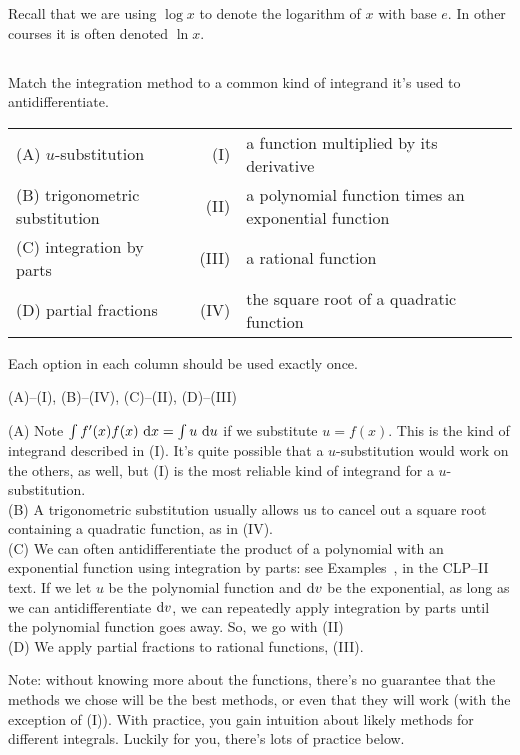 %
%

\noindent
Recall that we are using $\log x$ to denote the logarithm of $x$ with
base $e$. In other courses it is often denoted $\ln x$.


\subsection*{\Conceptual}
\begin{question}
Match the integration method to a common kind of integrand it's used to antidifferentiate.

\begin{tabular}{lrl}
 (A) $u$-substitution & (I)& a function multiplied by its derivative \\
(B) trigonometric substitution & (II) &a polynomial function times an exponential function\\
(C) integration by parts & (III) &a rational function\\
(D) partial fractions & (IV) &the square root of a quadratic function
\end{tabular}
\end{question}
\begin{hint}
Each option in each column should be used exactly once.
\end{hint}
\begin{answer}
(A)--(I),\qquad
(B)--(IV),\qquad
(C)--(II),\qquad
(D)--(III)
\end{answer}
\begin{solution}
(A) Note $\int f'(x)f(x)\ \dee{x} = \int u\ \dee{u} $ if we substitute $u=f(x)$. This is the kind of integrand described in (I). It's quite possible that a $u$-substitution would work on the others, as well, but (I) is the most reliable kind of integrand for a $u$-substitution.\\
(B) A trigonometric substitution usually allows us to cancel out a square root containing a quadratic function, as in (IV).\\
(C) We can often antidifferentiate the product of a polynomial with an exponential function using integration by parts: see Examples~, 
 in the CLP--II text. If we let $u$ be the polynomial function and $\mathrm{d}v$ be the exponential, as long as we can antidifferentiate $\mathrm{d}v$, we can repeatedly apply integration by parts until the polynomial function goes away. So, we go with (II)\\
(D) We apply partial fractions to rational functions, (III).

Note: without knowing more about the functions, there's no guarantee that the methods we chose will be the best methods, or even that they will work (with the exception of (I)).  With practice, you gain intuition about likely methods for different integrals. Luckily for you, there's lots of practice below.
\end{solution}



